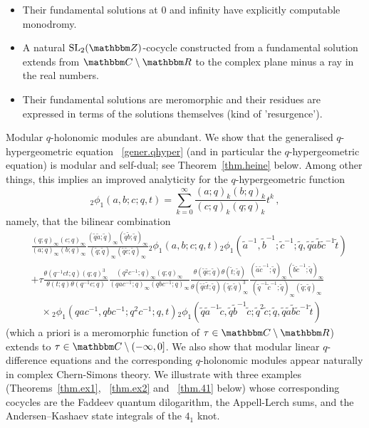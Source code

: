 \documentclass[12pt,reqno]{amsart}
\theoremstyle{definition}
\def\BZ{\mathbbm Z}
\def\BR{\mathbbm R}
\def\BC{\mathbbm C}
\def\SL{\mathrm{SL}}
\def\tq{\tilde{q}}
\def\be{\begin{equation}}
\def\ee{\end{equation}}
\begin{document}
\begin{itemize}
  \item
 Their fundamental solutions at 0 and infinity have explicitly
  computable monodromy.
\item
  A natural $\SL_2(\BZ)$-cocycle constructed from a fundamental
  solution extends from $\BC\setminus\BR$ to the complex plane minus a ray in
  the real numbers.
\item
  Their fundamental solutions are meromorphic and their residues are
  expressed in terms of the solutions themselves (kind of 'resurgence').
\end{itemize}
Modular $q$-holonomic modules are abundant. We show that the generalised
$q$-hypergeometric equation ~\eqref{gener.qhyper} (and in particular
the $q$-hypergeometric equation) is modular and self-dual; see
Theorem~\ref{thm.heine} below. Among other things, this implies an improved
analyticity for the $q$-hypergeometric function
\be
\label{2phi1}
  {}_{2}\phi_{1}(a,b;c;q,t) =
  \sum_{k=0}^{\infty}\frac{(a;q)_{k}(b;q)_{k}}{(c;q)_{k}(q;q)_{k}}t^{k} \,,
\ee
namely, that the bilinear combination
\be
\begin{aligned}
  &\frac{(q;q)_{\infty}(c;q)_{\infty}}{(a;q)_{\infty}(b;q)_{\infty}}
  \frac{(\tq\tilde{a};\tq)_{\infty}(\tq\tilde{b};\tq)_{\infty}}{
    (\tq;\tq)_{\infty}(\tq\tilde{c};\tq)_{\infty}}{}_{2}\phi_{1}(a,b;c;q,t)
  {}_{2}\phi_{1}(\tilde{a}^{-1},\tilde{b}^{-1};\tilde{c}^{-1};\tq,\tq\tilde{a}
  \tilde{b}\tilde{c}^{-1}\tilde{t})\\
  &+\tau\frac{\theta(q^{-1}ct;q)(q;q)_{\infty}^{3}}{\theta(t;q)\theta(q^{-1}c;q)}
  \frac{(q^{2}c^{-1};q)_{\infty}(q;q)_{\infty}}{
    (qac^{-1};q)_{\infty}(qbc^{-1};q)_{\infty}}
  \frac{\theta(\tq\tilde{c};\tq)\theta(\tilde{t};\tq)}{
    \theta(\tq\tilde{c}\tilde{t};\tq)
    (\tq;\tq)_{\infty}^3}\frac{(\tilde{a}\tilde{c}^{-1};\tq)_{\infty}
    (\tilde{b}\tilde{c}^{-1};\tq)_{\infty}}{(\tq^{-1}\tilde{c}^{-1};\tq)_{\infty}
    (\tq;\tq)_{\infty}}\\
  &\quad\times{}_{2}\phi_{1}(qac^{-1},qbc^{-1};q^2c^{-1};q,t)
  {}_{2}\phi_{1}(\tq\tilde{a}^{-1}\tilde{c},
  \tq\tilde{b}^{-1}\tilde{c};\tq^2\tilde{c};
  \tq,\tq\tilde{a}\tilde{b}\tilde{c}^{-1}\tilde{t})
\end{aligned}
\ee
(which a priori is a meromorphic function of $\tau \in \BC\setminus\BR$)
extends to $\tau\in\BC\setminus(-\infty,0]$.
We also show that modular linear $q$-difference equations and the corresponding
$q$-holonomic modules appear naturally in complex Chern-Simons theory. We illustrate
with three examples (Theorems~\ref{thm.ex1}, ~\ref{thm.ex2} and ~\ref{thm.41} below)
whose corresponding cocycles are the Faddeev quantum dilogarithm, the Appell-Lerch
sums, and the Andersen--Kashaev state integrals of the $4_1$ knot.
\end{document}
